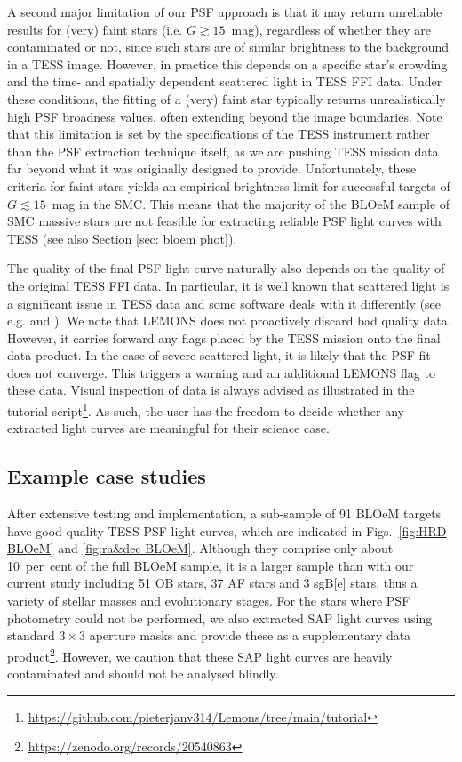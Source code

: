 \documentclass[fleqn,usenatbib]{mnras}
\begin{document}
A second major limitation of our PSF approach is that it may return unreliable results for (very) faint stars (i.e. $G \gtrsim 15$~mag), regardless of whether they are contaminated or not, since such stars are of similar brightness to the background in a TESS image. However, in practice this depends on a specific star's crowding and the time- and spatially dependent scattered light in TESS FFI data. Under these conditions, the fitting of a (very) faint star typically returns unrealistically high PSF broadness values, often extending beyond the image boundaries. Note that this limitation is set by the specifications of the TESS instrument rather than the PSF extraction technique itself, as we are pushing TESS mission data far beyond what it was originally designed to provide. Unfortunately, these criteria for faint stars yields an empirical brightness limit for successful targets of $G \lesssim 15$~mag in the SMC. This means that the majority of the BLOeM sample of SMC massive stars are not feasible for extracting reliable PSF light curves with TESS (see also Section \ref{sec: bloem phot}).

The quality of the final PSF light curve naturally also depends on the quality of the original TESS FFI data. In particular, it is well known that scattered light is a significant issue in TESS data \citep{Vanderspek+2018} and some software deals with it differently (see e.g. \citealt{RiddenHarper+2021} and \citealt{Roxburgh+2025}). We note that {\sc LEMONS} does not proactively discard bad quality data. However, it carries forward any flags placed by the TESS mission onto the final data product. In the case of severe scattered light, it is likely that the PSF fit does not converge. This triggers a warning and an additional {\sc LEMONS} flag to these data. Visual inspection of data is always advised as illustrated in the tutorial script\footnote{\url{https://github.com/pieterjanv314/Lemons/tree/main/tutorial}}. As such, the user has the freedom to decide whether any extracted light curves are meaningful for their science case.

\subsection{Example case studies}

After extensive testing and implementation, a sub-sample of 91 BLOeM targets have good quality TESS PSF light curves, which are indicated in Figs.~\ref{fig:HRD BLOeM} and \ref{fig:ra&dec BLOeM}. Although they comprise only about 10~per~cent of the full BLOeM sample, it is a larger sample than \citet{BowmanVanDaele2024} with our current study including 51 OB stars, 37 AF stars and 3 sgB[e] stars, thus a variety of stellar masses and evolutionary stages. For the stars where PSF photometry could not be performed, we also extracted SAP light curves using standard $3\times3$ aperture masks and provide these as a supplementary data product\footnote{\url{https://zenodo.org/records/20540863}}. However, we caution that these SAP light curves are heavily contaminated and should not be analysed blindly.
\end{document}
